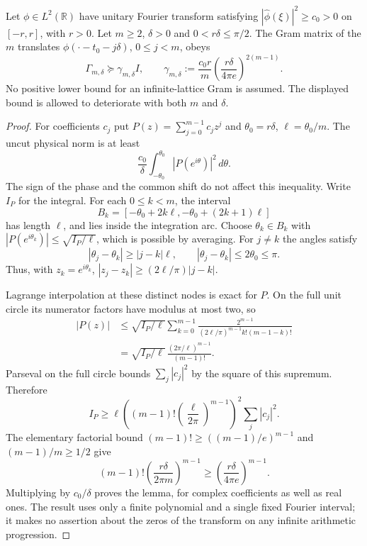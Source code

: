 \begin{lemma}
\label{lem:ns46-finite-arc}
Let $\phi\in L^2(\mathbb R)$ have unitary Fourier transform satisfying
$|\widehat\phi(\xi)|^2\ge c_0>0$ on $[-r,r]$, with $r>0$.
Let $m\ge2$, $\delta>0$ and $0<r\delta\le\pi/2$.
The Gram matrix of the $m$ translates
$\phi(\cdot-t_0-j\delta)$, $0\le j<m$, obeys
\begin{equation}\label{eq:ns46-gram-bound}
 \Gamma_{m,\delta}\succeq\gamma_{m,\delta}I,
 \qquad
 \gamma_{m,\delta}:=\frac{c_0r}{m}
       \left(\frac{r\delta}{4\pi e}\right)^{2(m-1)}.
\end{equation}
No positive lower bound for an infinite-lattice Gram is assumed.
The displayed bound is allowed to deteriorate with both $m$ and $\delta$.
\end{lemma}
\begin{proof}
For coefficients $c_j$ put $P(z)=\sum_{j=0}^{m-1}c_jz^j$ and
$\theta_0=r\delta$, $\ell=\theta_0/m$. The uncut physical norm is at least
\[
 \frac{c_0}{\delta}\int_{-\theta_0}^{\theta_0}
                      |P(e^{i\theta})|^2\,d\theta.
\]
The sign of the phase and the common shift do not affect this inequality.
Write $I_P$ for the integral. For each $0\le k<m$, the interval
\[
 B_k=[-\theta_0+2k\ell,-\theta_0+(2k+1)\ell]
\]
has length $\ell$, and lies inside the integration arc. Choose
$\theta_k\in B_k$ with
$|P(e^{i\theta_k})|\le\sqrt{I_P/\ell}$, which is possible by averaging.
For $j\ne k$ the angles satisfy
\[
 |\theta_j-\theta_k|\ge |j-k|\ell,
 \qquad |\theta_j-\theta_k|\le2\theta_0\le\pi.
\]
Thus, with $z_k=e^{i\theta_k}$,
$|z_j-z_k|\ge(2\ell/\pi)|j-k|$.

Lagrange interpolation at these distinct nodes is exact for $P$.
On the full unit circle its numerator factors have modulus at most two,
so
\begin{align*}
 |P(z)|
 &\le\sqrt{I_P/\ell}
   \sum_{k=0}^{m-1}
   \frac{2^{m-1}}{(2\ell/\pi)^{m-1}k!(m-1-k)!}\\
 &=\sqrt{I_P/\ell}\,
   \frac{(2\pi/\ell)^{m-1}}{(m-1)!}.
\end{align*}
Parseval on the full circle bounds $\sum_j|c_j|^2$ by the square
of this supremum. Therefore
\[
 I_P\ge\ell
 \left((m-1)!\left(\frac{\ell}{2\pi}\right)^{m-1}\right)^2
 \sum_j|c_j|^2.
\]
The elementary factorial bound
$(m-1)!\ge((m-1)/e)^{m-1}$ and $(m-1)/m\ge1/2$ give
\[
 (m-1)!\left(\frac{r\delta}{2\pi m}\right)^{m-1}
 \ge\left(\frac{r\delta}{4\pi e}\right)^{m-1}.
\]
Multiplying by $c_0/\delta$ proves the lemma, for complex coefficients
as well as real ones. The result uses only a finite polynomial and a
single fixed Fourier interval; it makes no assertion about the zeros
of the transform on any infinite arithmetic progression.
\end{proof}

